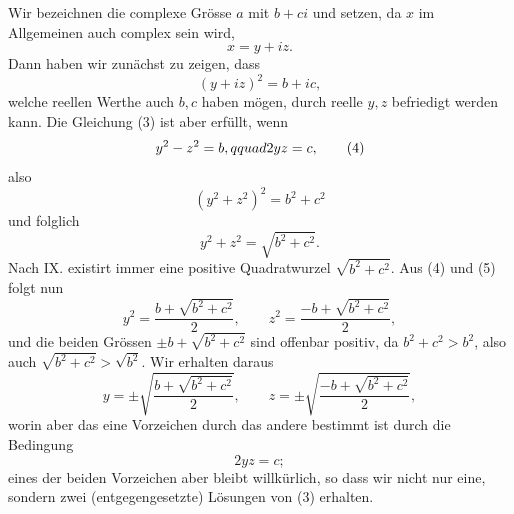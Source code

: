 \documentclass[11pt]{article}
\begin{document}
Wir bezeichnen die complexe Grösse $a$ mit $b+ci$ und setzen, da $x$ im Allgemeinen auch complex sein wird,
\[
 x=y+iz.
\]
Dann haben wir zunächst zu zeigen, dass
\begin{equation}
 (y+iz)^2=b+ic,
\tag{3}
\end{equation}
welche reellen Werthe auch $b,c$ haben mögen, durch reelle $y,z$ befriedigt werden kann. Die Gleichung (3) ist aber erfüllt, wenn
\begin{equation}
 y^2-z^2=b,\\qquad 2yz=c,
\tag{4}
\end{equation}
also
\[
 (y^2+z^2)^2=b^2+c^2
\]
und folglich
\begin{equation}
 y^2+z^2=\sqrt{b^2+c^2}.
\tag{5}
\end{equation}
Nach IX. existirt immer eine positive Quadratwurzel $\sqrt{b^2+c^2}$. Aus (4) und (5) folgt nun
\[
 y^2=\frac{b+\sqrt{b^2+c^2}}{2},\qquad
 z^2=\frac{-b+\sqrt{b^2+c^2}}{2},
\]
und die beiden Grössen $\pm b+\sqrt{b^2+c^2}$ sind offenbar positiv, da $b^2+c^2>b^2$, also auch $\sqrt{b^2+c^2}>\sqrt{b^2}$. Wir erhalten daraus
\[
 y=\pm\sqrt{\frac{b+\sqrt{b^2+c^2}}{2}},\qquad
 z=\pm\sqrt{\frac{-b+\sqrt{b^2+c^2}}{2}},
\]
worin aber das eine Vorzeichen durch das andere bestimmt ist durch die Bedingung
\[
 2yz=c;
\]
eines der beiden Vorzeichen aber bleibt willkürlich, so dass wir nicht nur eine, sondern zwei (entgegengesetzte) Lösungen von (3) erhalten.
\end{document}
